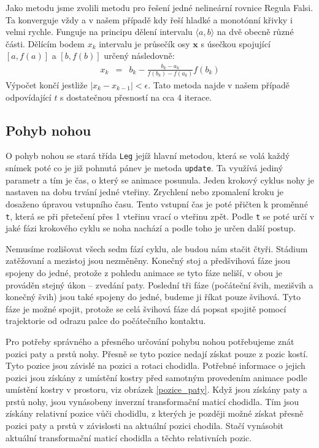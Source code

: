 Jako metodu jsme zvolili metodu pro řešení jedné nelineární rovnice Regula Falsi. Ta konverguje vždy a v našem případě kdy řeší hladké a monotónní křivky i velmi rychle. Funguje na principu dělení intervalu $\langle a, b \rangle$ na dvě obecně různé části. Dělícím bodem $x_k$ intervalu je průsečík osy $\mathbf{x}$ s úsečkou spojující $[a,f(a)]$ a $[b,f(b)]$ určený následovně:
\begin{eqnarray}
x_k &=& b_k - \frac{b_k-a_k}{f(b_k)-f(a_k)}f(b_k)
\label{r.regula_falsi}
\end{eqnarray}
Výpočet končí jestliže $|x_k - x_{k-1}| < \epsilon$. Tato metoda najde v našem případě odpovídající $t$ s dostatečnou přesností na cca 4 iterace.


\subsection{Pohyb nohou}
O pohyb nohou se stará třída \texttt{Leg} jejíž hlavní metodou, která se volá každý snímek poté co je již pohnutá pánev je metoda \texttt{update}. Ta využívá jediný parametr a tím je čas, o který se animace posunula. Jeden krokový cyklus nohy je nastaven na dobu trvání jedné vteřiny. Zrychlení nebo zpomalení kroku je dosaženo úpravou vstupního času. Tento vstupní čas je poté přičten k proměnné \texttt{t}, která se při přetečení přes 1 vteřinu vrací o vteřinu zpět. Podle \texttt{t} se poté určí v jaké fázi krokového cyklu se noha nachází a podle toho je určen další postup.

Nemusíme rozlišovat všech sedm fází cyklu, ale budou nám stačit čtyři. Stádium zatěžovaní a mezistoj jsou nezměněny. Konečný stoj a předšvihová fáze jsou spojeny do jedné, protože z pohledu animace se tyto fáze neliší, v obou je prováděn stejný úkon -- zvedání paty. Poslední tři fáze (počáteční švih, mezišvih a konečný švih) jsou také spojeny do jedné, budeme ji říkat pouze švihová. Tyto fáze je možné spojit, protože se celá švihová fáze dá popsat spojitě pomocí trajektorie od odrazu palce do počátečního kontaktu.

Pro potřeby správného a přesného určování pohybu nohou potřebujeme znát pozici paty a prstů nohy. Přesně se tyto pozice nedají získat pouze z pozic kostí. Tyto pozice jsou závislé na pozici a rotaci chodidla. Potřebné informace o jejich pozici jsou získány z umístění kostry před samotným provedením animace podle umístění kostry v prostoru, viz obrázek \ref{pozice_paty}. Když jsou získány paty a prstů nohy, jsou vynásobeny inverzní transformační maticí chodidla. Tím jsou získány relativní pozice vůči chodidlu, z kterých je později možné získat přesně pozici paty a prstů v závislosti na aktuální pozici chodila. Stačí vynásobit aktuální transformační maticí chodidla a těchto relativních pozic.

